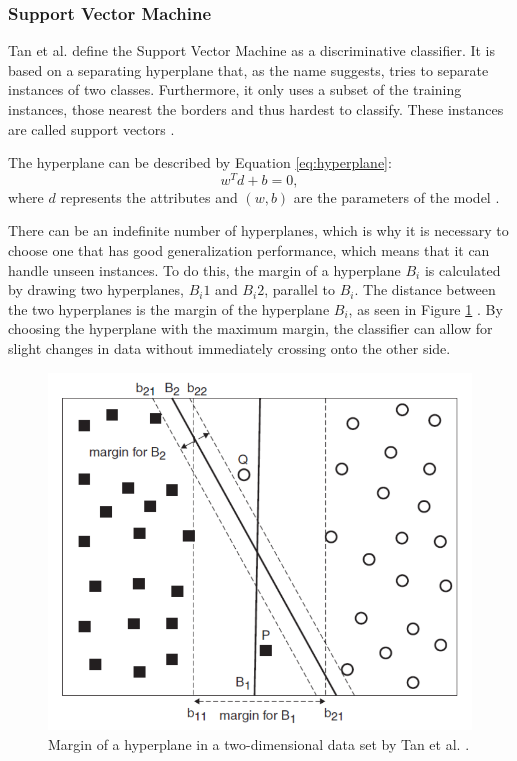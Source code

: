 \subsubsection{Support Vector Machine}
Tan et al. define the Support Vector Machine as a discriminative classifier. It is based on a separating hyperplane that, as the name suggests, tries to separate instances of two classes. Furthermore, it only uses a subset of the training instances, those nearest the borders and thus hardest to classify. These instances are called support vectors \cite{DBLP:books/aw/TanSKK2019}.

The hyperplane can be described by Equation \eqref{eq:hyperplane}:
    \begin{equation}
            \label{eq:hyperplane}
                w^Td + b = 0,
        \end{equation}
    where $d$ represents the attributes and $(w, b)$ are the parameters of the model \cite{DBLP:books/aw/TanSKK2019}. 
    
    There can be an indefinite number of hyperplanes, which is why it is necessary to choose one that has good generalization performance, which means that it can handle unseen instances. To do this, the margin of a hyperplane $B_i$ is calculated by drawing two hyperplanes, $B_i1$ and $B_i2$, parallel to $B_i$. The distance between the two hyperplanes is the margin of the hyperplane $B_i$, as seen in Figure \ref{fig:svm} \cite{DBLP:books/aw/TanSKK2019}. By choosing the hyperplane with the maximum margin, the classifier can allow for slight changes in data without immediately crossing onto the other side.

    \begin{figure}
        \centering
        \caption{Margin of a hyperplane in a two-dimensional data set by Tan et al. \cite{DBLP:books/aw/TanSKK2019}.
        \label{fig:svm}
        }
        \includegraphics[scale=0.7]{Images/SVM_image.png}
    \end{figure}
    

